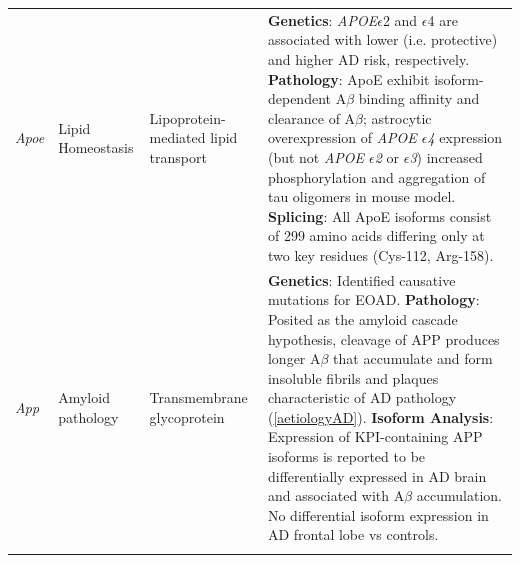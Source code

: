 \begin{landscape}
\begin{longtable}[c]{p{1cm}p{2cm}p{4cm}p{19cm}}
			\centering \textit{Apoe} &
			\centering Lipid Homeostasis  &
			\centering Lipoprotein-mediated lipid transport  &
			\tabitem \textbf{Genetics}: \textit{APOE}$\epsilon$2 and $\epsilon$4 are associated with lower (i.e. protective) and higher AD risk, respectively. \newline
			\tabitem \textbf{Pathology}: ApoE exhibit isoform-dependent A$\beta$ binding affinity and clearance of A$\beta$; astrocytic overexpression of \textit{APOE $\epsilon$4} expression (but not \textit{APOE $\epsilon$2} or \textit{$\epsilon$3}) increased phosphorylation and aggregation of tau oligomers in mouse model\cite{Jablonski2021}. \newline
			\tabitem \textbf{Splicing}: All ApoE isoforms consist of 299 amino acids differing only at two key residues (Cys-112, Arg-158). \\
			
			\centering \textit{App} &
			\centering Amyloid pathology  &
			\centering Transmembrane glycoprotein  &
			\tabitem \textbf{Genetics}: Identified causative mutations for EOAD. \newline
			\tabitem \textbf{Pathology}: Posited as the amyloid cascade hypothesis, cleavage of APP produces longer A$\beta$ that accumulate and form insoluble fibrils and plaques characteristic of AD pathology (\cref{aetiologyAD}).\newline
			\tabitem \textbf{Isoform Analysis}: Expression of KPI-containing APP isoforms is reported to be differentially expressed in AD brain and associated with A$\beta$ accumulation\cite{Zhang2011}. No differential isoform expression in AD frontal lobe vs controls\cite{Panegyres2000}. \\
			\hdashline[0.5pt/5pt]
			

\end{longtable}
\end{landscape}
